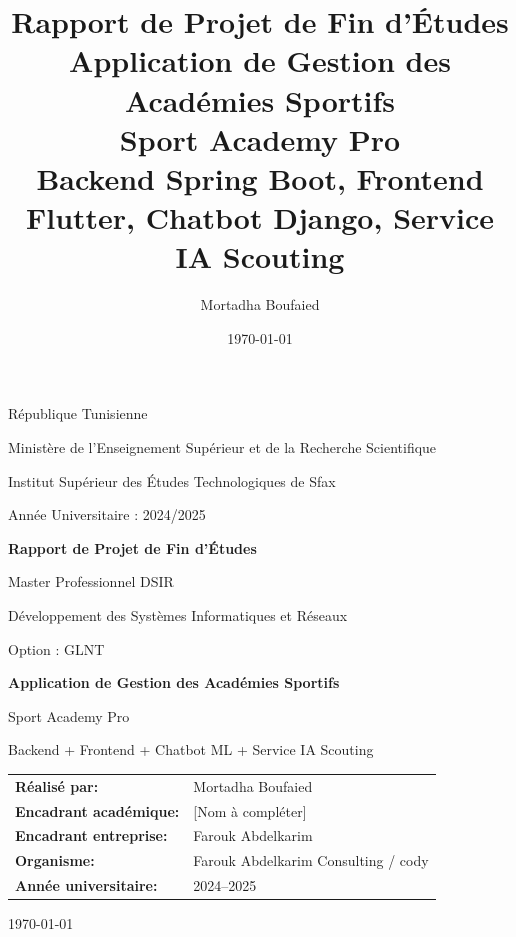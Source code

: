 \documentclass[12pt,a4paper]{report}
\title{\textbf{Rapport de Projet de Fin d'Études}\\
Application de Gestion des Académies Sportifs\\
\large Sport Academy Pro\\
\small Backend Spring Boot, Frontend Flutter, Chatbot Django, Service IA Scouting}
\author{Mortadha Boufaied}
\date{\today}
\begin{document}
\begin{titlepage}
  \centering
  {\Large République Tunisienne \par}
  \vspace{0.4cm}
  {\large Ministère de l'Enseignement Supérieur et de la Recherche Scientifique \par}
  \vspace{0.8cm}
  {\Large Institut Supérieur des Études Technologiques de Sfax \par}
  \vspace{0.4cm}
  {\large Année Universitaire : 2024/2025 \par}
  \vspace{1.0cm}
  {\Large \textbf{Rapport de Projet de Fin d'Études} \par}
  \vspace{0.5cm}
  {\large Master Professionnel DSIR \par}
  \vspace{0.3cm}
  {\large Développement des Systèmes Informatiques et Réseaux \par}
  \vspace{0.3cm}
  {\large Option : GLNT \par}
  \vspace{1.2cm}
  {\huge \textbf{Application de Gestion des Académies Sportifs} \par}
  \vspace{0.3cm}
  {\Large Sport Academy Pro \par}
  \vspace{0.3cm}
  {\large Backend + Frontend + Chatbot ML + Service IA Scouting \par}
  \vfill

  \begin{tabular}{ll}
    \textbf{Réalisé par:} & Mortadha Boufaied \\
    \textbf{Encadrant académique:} & [Nom à compléter] \\
    \textbf{Encadrant entreprise:} & Farouk Abdelkarim \\
    \textbf{Organisme:} & Farouk Abdelkarim Consulting / cody \\
    \textbf{Année universitaire:} & 2024--2025
  \end{tabular}

  \vfill
  {\large \today \par}
\end{titlepage}

\tableofcontents
\listoftables
\clearpage




















\end{document}
